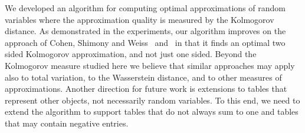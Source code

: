 \documentclass{article}
\begin{document}
	We developed an algorithm for computing optimal approximations of random variables where the approximation quality is measured by the Kolmogorov distance.
	As demonstrated in the experiments, our algorithm improves on the approach of Cohen, Shimony and Weiss~\cite{cohen2015estimating} and~\cite{CohenGW18} in that it finds an optimal two sided Kolmogorov approximation, and not just one sided. Beyond the Kolmogorov measure studied here we believe that similar approaches may apply also to total variation, to the Wasserstein distance, and to other measures of approximations. Another direction for future work is extensions to tables that represent other objects, not necessarily random variables. To this end, we need to extend the algorithm to support tables that do not always sum to one and tables that may contain negative entries.
	
	
	{}
	
	
\end{document}
